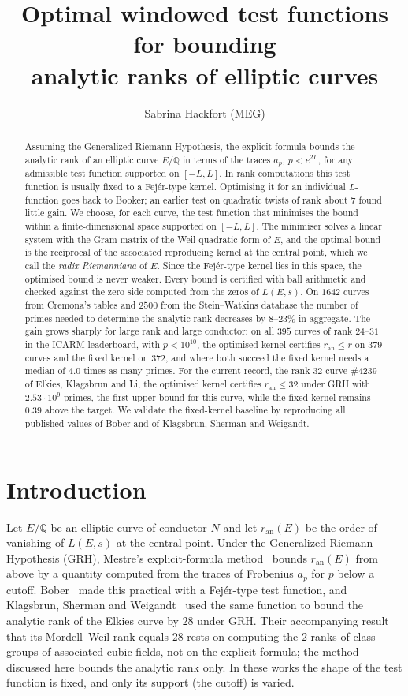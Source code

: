 \documentclass[11pt]{amsart}
\title[Optimal windowed test functions for analytic rank bounds]{Optimal windowed test functions for bounding\\ analytic ranks of elliptic curves}
\author{Sabrina Hackfort (MEG)}
\date{}
\theoremstyle{remark}
\theoremstyle{definition}
\newcommand{\Q}{\mathbb{Q}}
\newcommand{\ran}{r_{\mathrm{an}}}
\begin{document}
\begin{abstract}
Assuming the Generalized Riemann Hypothesis, the explicit formula bounds the analytic rank of an elliptic curve $E/\Q$ in terms of the traces $a_p$, $p<e^{2L}$, for any admissible test function supported on $[-L,L]$. In rank computations this test function is usually fixed to a Fej\'er-type kernel. Optimising it for an individual $L$-function goes back to Booker; an earlier test on quadratic twists of rank about $7$ found little gain. We choose, for each curve, the test function that minimises the bound within a finite-dimensional space supported on $[-L,L]$. The minimiser solves a linear system with the Gram matrix of the Weil quadratic form of $E$, and the optimal bound is the reciprocal of the associated reproducing kernel at the central point, which we call the \emph{radix Riemanniana} of $E$. Since the Fej\'er-type kernel lies in this space, the optimised bound is never weaker. Every bound is certified with ball arithmetic and checked against the zero side computed from the zeros of $L(E,s)$. On $1642$ curves from Cremona's tables and $2500$ from the Stein--Watkins database the number of primes needed to determine the analytic rank decreases by $8$--$23\%$ in aggregate. The gain grows sharply for large rank and large conductor: on all $395$ curves of rank $24$--$31$ in the ICARM leaderboard, with $p<10^{10}$, the optimised kernel certifies $\ran\le r$ on $379$ curves and the fixed kernel on $372$, and where both succeed the fixed kernel needs a median of $4.0$ times as many primes. For the current record, the rank-$32$ curve \#4239 of Elkies, Klagsbrun and Li, the optimised kernel certifies $\ran\le32$ under GRH with $2.53\cdot10^{9}$ primes, the first upper bound for this curve, while the fixed kernel remains $0.39$ above the target. We validate the fixed-kernel baseline by reproducing all published values of Bober and of Klagsbrun, Sherman and Weigandt.
\end{abstract}

\maketitle

\section{Introduction}

Let $E/\Q$ be an elliptic curve of conductor $N$ and let $\ran(E)$ be the order of vanishing of $L(E,s)$ at the central point. Under the Generalized Riemann Hypothesis (GRH), Mestre's explicit-formula method~\cite{Mestre} bounds $\ran(E)$ from above by a quantity computed from the traces of Frobenius $a_p$ for $p$ below a cutoff. Bober~\cite{Bober} made this practical with a Fej\'er-type test function, and Klagsbrun, Sherman and Weigandt~\cite{KSW} used the same function to bound the analytic rank of
the Elkies curve by $28$ under GRH. Their accompanying result that its Mordell--Weil rank equals $28$
rests on computing the $2$-ranks of class groups of associated cubic fields, not on the explicit
formula; the method discussed here bounds the analytic rank only. In these works the shape of the test function is fixed, and only its support (the cutoff) is varied.
\end{document}
